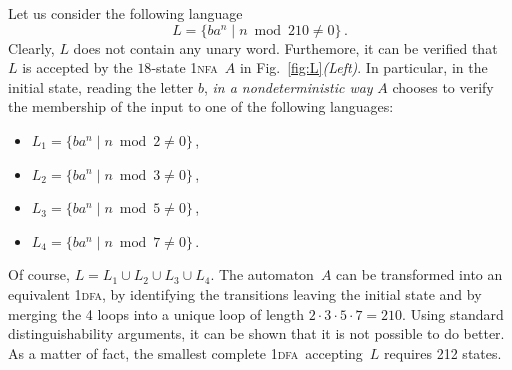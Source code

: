 \documentclass[11pt]{article}
\newcommand*{\ow}{\textsc{1}}
\newcommand*{\owdfa}{\ow\textsc{dfa}}
\newcommand*{\ownfa}{\ow\textsc{nfa}}
\newenvironment{example}{\begin{ex}\rm}{\end{ex}}
\begin{document}
\begin{example}\label{example}
Let us consider the following language
\[
L=\{ba^n\mid n\bmod 210\neq 0\}\,.
\]
Clearly, $L$ does not contain any unary word. Furthemore, it can be verified that~$L$ is accepted by the 
$18$-state \ownfa~$A$ in Fig.~\ref{fig:L}\emph{(Left)}.
In particular, in the initial state, reading the letter $b$, \emph{in a nondeterministic way} $A$ chooses 
to verify the membership of the input to one of the following languages:
\begin{itemize}
\item $L_1=\{ba^n\mid n\bmod 2\neq 0\}$\,,
\item $L_2=\{ba^n\mid n\bmod 3\neq 0\}$\,,
\item $L_3=\{ba^n\mid n\bmod 5\neq 0\}$\,,
\item $L_4=\{ba^n\mid n\bmod 7\neq 0\}$\,.
\end{itemize}
Of course, $L=L_1\cup L_2\cup L_3\cup L_4$.
The automaton~$A$ can be transformed into an equivalent \owdfa, by identifying the transitions leaving the initial
state and by merging the 4 loops into a unique loop of length $2\cdot 3\cdot 5\cdot 7 = 210$.
Using standard distinguishability arguments, it can be shown that it is not possible to do better. As a matter
of fact, the smallest complete \owdfa\ accepting~$L$ requires 212 states.


\end{example}
\end{document}
